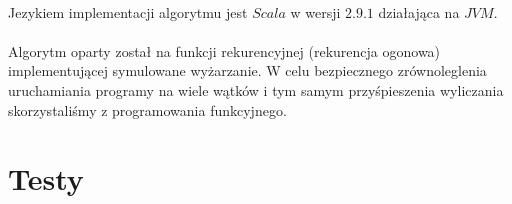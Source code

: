 \documentclass[wide,a4paper,titlepage,12pt] {article}
\begin{document}
\paragraph{}
Jezykiem implementacji algorytmu jest $Scala$ w wersji $2.9.1$ działająca na $JVM$. 
\paragraph{}
Algorytm oparty został na funkcji rekurencyjnej (rekurencja ogonowa) implementującej symulowane wyżarzanie. W celu bezpiecznego zrównoleglenia uruchamiania programy na wiele wątków i tym samym przyśpieszenia wyliczania skorzystaliśmy z programowania funkcyjnego.

\lstset{ %
    language=java,                %
    basicstyle=\scriptsize,       %
    numbers=left,                   %
    numberstyle=\scriptsize,      %
    stepnumber=10,                   %
    numbersep=9pt,                  %
    showspaces=false,               %
    showstringspaces=false,         %
    showtabs=false,                 %
    breaklines=true,                %
    }
    

\newpage
\section{Testy}
\end{document}
